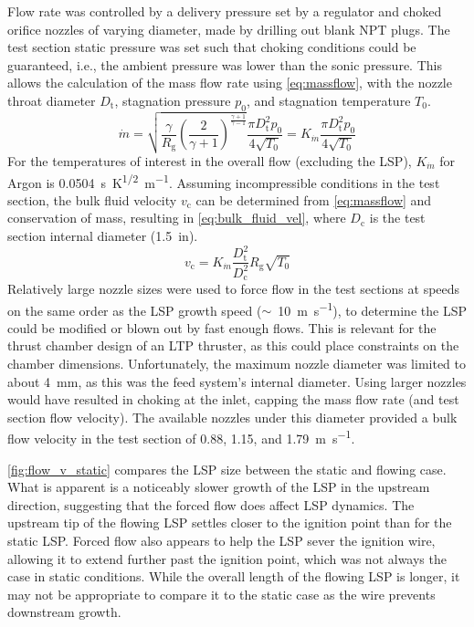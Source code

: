         Flow rate was controlled by a delivery pressure set by a regulator and choked orifice nozzles of varying diameter, made by drilling out blank NPT plugs. The test section static pressure was set such that choking conditions could be guaranteed, i.e., the ambient pressure was lower than the sonic pressure. This allows the calculation of the mass flow rate using \autoref{eq:massflow}, with the nozzle throat diameter $D_\mathrm{t}$, stagnation pressure $p_0$, and stagnation temperature $T_0$. 
        \begin{equation} \label{eq:massflow}
            \dot{m} = \sqrt{\frac{\gamma}{R_\mathrm{g}}\left(\frac{2}{\gamma+1}\right)^\frac{\gamma+1}{\gamma-1}}\frac{\pi D_\mathrm{t}^2p_0}{4\sqrt{T_0}} = K_{\dot{m}}\frac{\pi D_\mathrm{t}^2p_0}{4\sqrt{T_0}}
        \end{equation}
        For the temperatures of interest in the overall flow (excluding the LSP), $K_{\dot{m}}$ for Argon is \qty{0.0504}{s.K^{1/2}.m^{-1}}. Assuming incompressible conditions in the test section, the bulk fluid velocity $v_\mathrm{c}$ can be determined from \autoref{eq:massflow} and conservation of mass, resulting in \autoref{eq:bulk_fluid_vel}, where $D_\mathrm{c}$ is the test section internal diameter (\qty{1.5}{in}).
        \begin{equation} \label{eq:bulk_fluid_vel}
            v_\mathrm{c} = K_{\dot{m}}\frac{D_\mathrm{t}^2}{D_\mathrm{c}^2}R_\mathrm{g}\sqrt{T_0}
        \end{equation}
        Relatively large nozzle sizes were used to force flow in the test sections at speeds on the same order as the LSP growth speed ($\sim$~\qty{10}{m.s^{-1}}), to determine the LSP could be modified or blown out by fast enough flows. This is relevant for the thrust chamber design of an LTP thruster, as this could place constraints on the chamber dimensions. Unfortunately, the maximum nozzle diameter was limited to about \qty{4}{mm}, as this was the feed system's internal diameter. Using larger nozzles would have resulted in choking at the inlet, capping the mass flow rate (and test section flow velocity). The available nozzles under this diameter provided a bulk flow velocity in the test section of 0.88, 1.15, and \qty{1.79}{m.s^{-1}}.

        \autoref{fig:flow_v_static} compares the LSP size between the static and flowing case. What is apparent is a noticeably slower growth of the LSP in the upstream direction, suggesting that the forced flow does affect LSP dynamics. The upstream tip of the flowing LSP settles closer to the ignition point than for the static LSP. Forced flow also appears to help the LSP sever the ignition wire, allowing it to extend further past the ignition point, which was not always the case in static conditions. While the overall length of the flowing LSP is longer, it may not be appropriate to compare it to the static case as the wire prevents downstream growth.

